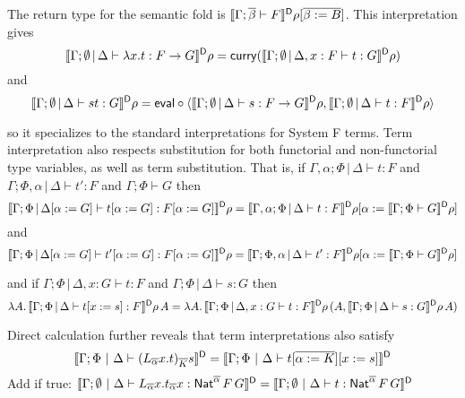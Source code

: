 \documentclass{lmcs}
\theoremstyle{plain}\newtheorem{satz}[thm]{Satz}
\begin{document}
{The return type for the semantic fold is
  $\llbracket{\Gamma;\overline{\beta} \vdash F}\rrbracket^{\mathsf D}\rho[\overline{\beta := B}]$.
This interpretation gives
\[\llbracket{\Gamma;\emptyset \,|\, \Delta
    \vdash \lambda x.t : F \to G}\rrbracket^{\mathsf D}\rho = \mathsf{curry}
  (\llbracket{\Gamma;\emptyset \,|\, \Delta, x : F \vdash t :
  G}\rrbracket^{\mathsf D}\rho)\]
and
\[\llbracket{\Gamma;\emptyset \,|\, \Delta \vdash st:
    G}\rrbracket^{\mathsf D} \rho = \mathsf{eval} \circ \langle \llbracket{\Gamma;\emptyset \,|\, \Delta
  \vdash s: F \to G}\rrbracket^{\mathsf D}\rho, \llbracket{\Gamma;\emptyset \,|\, \Delta \vdash
  t: F}\rrbracket^{\mathsf D}\rho \rangle\]

\vspace*{0.05in}

\noindent
so it specializes to the standard interpretations for System F terms.
Term interpretation also respects substitution for both functorial and
non-functorial type variables, as well as term substitution. That is,
if $\Gamma,\alpha;\Phi \,|\, \Delta \vdash t : F$ and
$\Gamma;\Phi,\alpha \,|\, \Delta \vdash t' : F$ and $\Gamma;\Phi
\vdash G$ then
\[\llbracket{\Gamma;\Phi \,|\, \Delta[\alpha := G] \vdash t[\alpha :=
    G] : F[\alpha := G]}\rrbracket^{\mathsf D}\rho = \llbracket{\Gamma,\alpha;\Phi \,|\, \Delta
  \vdash t : F }\rrbracket^{\mathsf D}\rho [ \alpha := \llbracket{\Gamma;\Phi\vdash G}\rrbracket^{\mathsf D}\rho ]\]
and
\[\llbracket{\Gamma;\Phi \,|\, \Delta[\alpha := G] \vdash t'[\alpha :=
    G] : F[\alpha := G]}\rrbracket^{\mathsf D}\rho = \llbracket{\Gamma;\Phi,\alpha \,|\, \Delta
  \vdash t' : F }\rrbracket^{\mathsf D}\rho [ \alpha := \llbracket{\Gamma;\Phi\vdash G}\rrbracket^{\mathsf D}\rho ]\]

\vspace*{0.05in}

\noindent
and if $\Gamma;\Phi \,|\, \Delta, x: G \vdash t : F$ and $\Gamma;\Phi
\,|\, \Delta \vdash s : G$ then
\[\lambda A.\, \llbracket{\Gamma;\Phi \,|\, \Delta \vdash t[x := s] :
  F }\rrbracket^{\mathsf D}\rho \, A = \lambda A.\,\llbracket{\Gamma;\Phi \,|\, \Delta, x: G
  \vdash t : F}\rrbracket^{\mathsf D}\rho \,(A, \llbracket{\Gamma;\Phi \,|\, \Delta\vdash s:
  G}\rrbracket^{\mathsf D}\rho\, A)\]

\vspace*{0.05in}

\noindent
Direct calculation further reveals that term interpretations also
satisfy
\[\llbracket{\Gamma; \Phi~|~\Delta \vdash
  (L_{\overline{\alpha}}x.t)_{\overline{K}}s}\rrbracket^{\mathsf D} = \llbracket{\Gamma; \Phi~|~\Delta \vdash
  t [\overline{\alpha := K}][x := s]}\rrbracket^{\mathsf D}\]
       {\color{red} Add if true:
$\llbracket{\Gamma; \emptyset~|~\Delta \vdash L_{\overline{\alpha}} x.t_{\overline{\alpha}} x :
   \mathsf{Nat}^{\overline{\alpha}}\, F\, G}\rrbracket^{\mathsf D} =  \llbracket{\Gamma; \emptyset~|~\Delta \vdash
   t : \mathsf{Nat}^{\overline{\alpha}}\, F\, G}\rrbracket^{\mathsf D}$}


}
\end{document}
